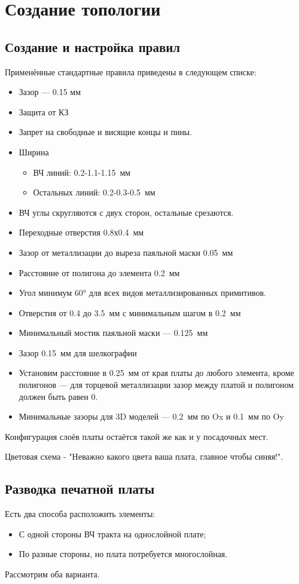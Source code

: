 \chapter{Создание топологии} \label{chap:altium-PcbDoc}


\section{Создание и настройка правил}

Применённые стандартные правила приведены в следующем списке:
\begin{itemize}
	\item Зазор --- 0.15 мм
	\item Защита от КЗ
	\item Запрет на свободные и висящие концы и пины.
	\item Ширина
		\begin{itemize}
			\item ВЧ линий: 0.2-1.1-1.15~мм
			\item Остальных линий: 0.2-0.3-0.5~мм
		\end{itemize}
	\item ВЧ углы скругляются с двух сторон, остальные срезаются.
	\item Переходные отверстия 0.8х0.4~мм
	\item Зазор  от металлизации  до  выреза паяльной маски 0.05~мм
	\item Расстояние от полигона до элемента 0.2~мм
	\item Угол минимум  60°  для  всех видов металлизированных примитивов. 
	\item Отверстия от 0.4 до 3.5~мм с минимальным шагом в 0.2~мм
	\item Минимальный мостик паяльной маски --- 0.125~мм
	\item Зазор 0.15~мм для шелкографии
	\item Установим расстояние в 0.25~мм от края платы до любого элемента, кроме полигонов --- для торцевой металлизации зазор между платой и полигоном должен быть равен 0.
	\item Минимальные зазоры для 3D моделей --- 0.2~мм по Ox и 0.1~мм по Oy
\end{itemize}

Конфигурация слоёв платы остаётся такой же как и у посадочных мест.

Цветовая схема - "Неважно какого цвета ваша плата, главное чтобы синяя!".

\section{Разводка печатной платы}
Есть два способа расположить элементы:
\begin{itemize}
	\item С одной стороны ВЧ тракта на однослойной плате;
	\item По разные стороны, но плата потребуется многослойная.
\end{itemize}
Рассмотрим оба варианта.

